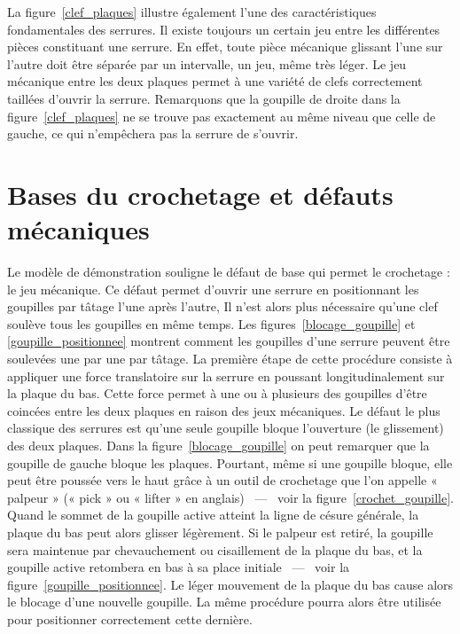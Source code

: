 \documentclass[a4paper,french,11pt,twoside]{report}
\begin{document}
La figure~\ref{clef_plaques} illustre également l'une des caractéristiques fondamentales des serrures. Il existe toujours un certain jeu entre les différentes pièces constituant une serrure. En effet, toute pièce mécanique glissant l'une sur l'autre doit être séparée par un intervalle, un jeu, même très léger. Le jeu mécanique entre les deux plaques permet à une variété de clefs correctement taillées d'ouvrir la serrure. Remarquons que la goupille de droite dans la figure~\ref{clef_plaques} ne se trouve pas exactement au même niveau que celle de gauche, ce qui n'empêchera pas la serrure de s'ouvrir.

\chapter{\label{chap:bases_defauts_mecaniques}Bases du crochetage et défauts mécaniques}

Le modèle de démonstration souligne le défaut de base qui permet le crochetage : le jeu mécanique. Ce défaut permet d'ouvrir une serrure en positionnant les goupilles par tâtage l'une après l'autre, Il n'est alors plus nécessaire qu'une clef soulève tous les goupilles en même temps. Les figures~\ref{blocage_goupille} et \ref{goupille_positionnee} montrent comment les goupilles d'une serrure peuvent être soulevées une par une par tâtage. La première étape de cette procédure consiste à appliquer une force translatoire sur la serrure en poussant longitudinalement sur la plaque du bas. Cette force permet à une ou à plusieurs des goupilles d'être coincées entre les deux plaques en raison des jeux mécaniques. Le défaut le plus classique des serrures est qu'une seule goupille bloque l'ouverture (le glissement) des deux plaques. Dans la figure~\ref{blocage_goupille} on peut remarquer que la goupille de gauche bloque les plaques. Pourtant, même si une goupille bloque, elle peut être poussée vers le haut grâce à un outil de crochetage que l'on appelle « palpeur » (« pick » ou « lifter » en anglais) ~---~ voir la figure~\ref{crochet_goupille}. Quand le sommet de la goupille active atteint la ligne de césure générale, la plaque du bas peut alors glisser légèrement. Si le palpeur est retiré, la goupille sera maintenue par chevauchement ou cisaillement de la plaque du bas, et la goupille active retombera en bas à sa place initiale ~---~ voir la figure~\ref{goupille_positionnee}. Le léger mouvement de la plaque du bas cause alors le blocage d'une nouvelle goupille. La même procédure pourra alors être utilisée pour positionner correctement cette dernière.
\end{document}
